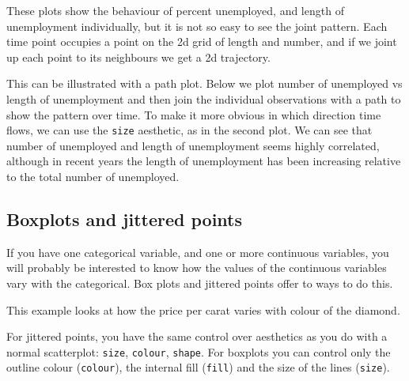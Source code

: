 These plots show the behaviour of percent unemployed, and length of unemployment individually, but it is not so easy to see the joint pattern.  Each time point occupies a point on the 2d grid of length and number, and if we joint up each point to its neighbours we get a 2d trajectory.

This can be illustrated with a path plot.  Below we plot number of unemployed vs length of unemployment and then join the individual observations with a path to show the pattern over time.  To make it more obvious in which direction time flows, we can use the {\tt size} aesthetic, as in the second plot.  We can see that number of unemployed and length of unemployment seems highly correlated, although in recent years the length of unemployment has been increasing relative to the total number of unemployed.

% 

\subsection{Boxplots and jittered points}\label{sub:boxplot}

If you have one categorical variable, and one or more continuous variables, you will probably be interested to know how the values of the continuous variables vary with the categorical.  Box plots and jittered points offer to ways to do this.  

This example looks at how the price per carat varies with colour of the diamond.

% 

% 
For jittered points, you have the same control over aesthetics as you do with a normal scatterplot: {\tt size}, {\tt colour}, {\tt shape}.  For boxplots you can control only the outline colour ({\tt colour}), the internal fill ({\tt fill}) and the size of the lines ({\tt size}).

